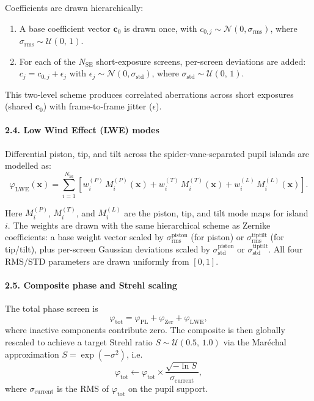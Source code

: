 \documentclass{aa}
\begin{document}
Coefficients are drawn hierarchically:
\begin{enumerate}
    \item A base coefficient vector $\mathbf{c}_0$ is drawn once, with $c_{0,j} \sim \mathcal{N}(0, \sigma_\mathrm{rms})$, where $\sigma_\mathrm{rms} \sim \mathcal{U}(0,\,1)$.
    \item For each of the $N_\mathrm{SE}$ short-exposure screens, per-screen deviations are added: $c_j = c_{0,j} + \epsilon_j$ with $\epsilon_j \sim \mathcal{N}(0, \sigma_\mathrm{std})$, where $\sigma_\mathrm{std} \sim \mathcal{U}(0,\,1)$.
\end{enumerate}

This two-level scheme produces correlated aberrations across short exposures (shared $\mathbf{c}_0$) with frame-to-frame jitter ($\epsilon$).

\paragraph{2.4. Low Wind Effect (LWE) modes}

Differential piston, tip, and tilt across the spider-vane-separated pupil islands are modelled as:
\begin{equation}
\varphi_\mathrm{LWE}(\mathbf{x}) = \sum_{i=1}^{N_\mathrm{isl}} \left[ w^{(P)}_i \, M^{(P)}_i(\mathbf{x}) + w^{(T)}_i \, M^{(T)}_i(\mathbf{x}) + w^{(L)}_i \, M^{(L)}_i(\mathbf{x}) \right].
\end{equation}

Here $M^{(P)}_i$, $M^{(T)}_i$, and $M^{(L)}_i$ are the piston, tip, and tilt mode maps for island $i$. The weights are drawn with the same hierarchical scheme as Zernike coefficients: a base weight vector scaled by $\sigma_\mathrm{rms}^\mathrm{piston}$ (for piston) or $\sigma_\mathrm{rms}^\mathrm{tiptilt}$ (for tip/tilt), plus per-screen Gaussian deviations scaled by $\sigma_\mathrm{std}^\mathrm{piston}$ or $\sigma_\mathrm{std}^\mathrm{tiptilt}$. All four RMS/STD parameters are drawn uniformly from $[0,1]$.

\paragraph{2.5. Composite phase and Strehl scaling}

The total phase screen is
\begin{equation}
\varphi_\mathrm{tot} = \varphi_\mathrm{PL} + \varphi_\mathrm{Zer} + \varphi_\mathrm{LWE},
\end{equation}
where inactive components contribute zero. The composite is then globally rescaled to achieve a target Strehl ratio $S \sim \mathcal{U}(0.5,\,1.0)$ via the Maréchal approximation $S = \exp(-\sigma^2)$, i.e.
\begin{equation}
\varphi_\mathrm{tot} \leftarrow \varphi_\mathrm{tot} \times \frac{\sqrt{-\ln S}}{\sigma_\mathrm{current}},
\end{equation}
where $\sigma_\mathrm{current}$ is the RMS of $\varphi_\mathrm{tot}$ on the pupil support.
\end{document}
